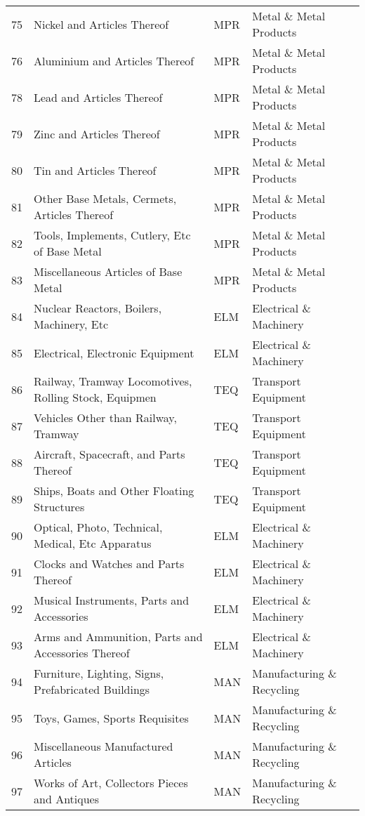 \documentclass[a4paper]{article}
\begin{document}
\begin{table}[ht]
{\begin{tabular}{rlll}
  75 & Nickel and Articles Thereof & MPR & Metal \& Metal Products \\ 
  76 & Aluminium and Articles Thereof & MPR & Metal \& Metal Products \\ 
  78 & Lead and Articles Thereof & MPR & Metal \& Metal Products \\ 
  79 & Zinc and Articles Thereof & MPR & Metal \& Metal Products \\ 
  80 & Tin and Articles Thereof & MPR & Metal \& Metal Products \\ 
  81 & Other Base Metals, Cermets, Articles Thereof & MPR & Metal \& Metal Products \\ 
  82 & Tools, Implements, Cutlery, Etc of Base Metal & MPR & Metal \& Metal Products \\ 
  83 & Miscellaneous Articles of Base Metal & MPR & Metal \& Metal Products \\ 
  84 & Nuclear Reactors, Boilers, Machinery, Etc & ELM & Electrical \& Machinery \\ 
  85 & Electrical, Electronic Equipment & ELM & Electrical \& Machinery \\ 
  86 & Railway, Tramway Locomotives, Rolling Stock, Equipmen & TEQ & Transport Equipment \\ 
  87 & Vehicles Other than Railway, Tramway & TEQ & Transport Equipment \\ 
  88 & Aircraft, Spacecraft, and Parts Thereof & TEQ & Transport Equipment \\ 
  89 & Ships, Boats and Other Floating Structures & TEQ & Transport Equipment \\ 
  90 & Optical, Photo, Technical, Medical, Etc Apparatus & ELM & Electrical \& Machinery \\ 
  91 & Clocks and Watches and Parts Thereof & ELM & Electrical \& Machinery \\ 
  92 & Musical Instruments, Parts and Accessories & ELM & Electrical \& Machinery \\ 
  93 & Arms and Ammunition, Parts and Accessories Thereof & ELM & Electrical \& Machinery \\ 
  94 & Furniture, Lighting, Signs, Prefabricated Buildings & MAN & Manufacturing \& Recycling \\ 
  95 & Toys, Games, Sports Requisites & MAN & Manufacturing \& Recycling \\ 
  96 & Miscellaneous Manufactured Articles & MAN & Manufacturing \& Recycling \\ 
  97 & Works of Art, Collectors Pieces and Antiques & MAN & Manufacturing \& Recycling \\ 

\end{tabular}}
\end{table}
\end{document}
